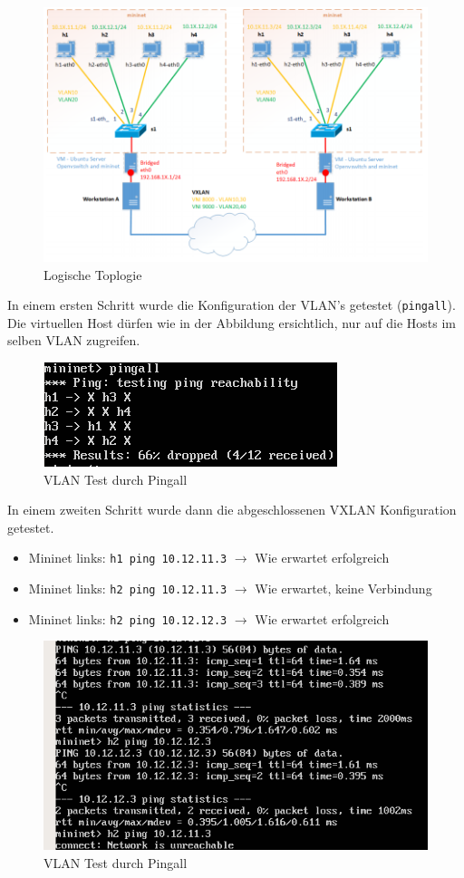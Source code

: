 \begin{figure}[h]
\centering
\includegraphics[width=0.7\linewidth]{images/vxlan_overview}
\caption{Logische Toplogie}
\label{fig:vxlanoverview}
\end{figure}

In einem ersten Schritt wurde die Konfiguration der VLAN's getestet (\lstinline|pingall|). Die virtuellen Host dürfen wie in der Abbildung ersichtlich, nur auf die Hosts im selben VLAN zugreifen.

\begin{figure}[h]
\centering
\includegraphics[width=0.5\linewidth]{images/vxlan_vlan_pingall}
\caption{VLAN Test durch Pingall}
\label{fig:vxlanvlanpingall}
\end{figure}
\newpage

In einem zweiten Schritt wurde dann die abgeschlossenen VXLAN Konfiguration getestet.
\begin{itemize}
	\item Mininet links: \lstinline|h1 ping 10.12.11.3| $\rightarrow$ Wie erwartet erfolgreich
	\item Mininet links: \lstinline|h2 ping 10.12.11.3| $\rightarrow$ Wie erwartet, keine Verbindung
	\item Mininet links: \lstinline|h2 ping 10.12.12.3| $\rightarrow$ Wie erwartet erfolgreich
\end{itemize} 
\begin{figure}[h]
	\centering
	\includegraphics[width=0.5\linewidth]{images/vxlan_final_test.png}
	\caption{VLAN Test durch Pingall}
	\label{fig:vxlanvlanpingall}
\end{figure}


